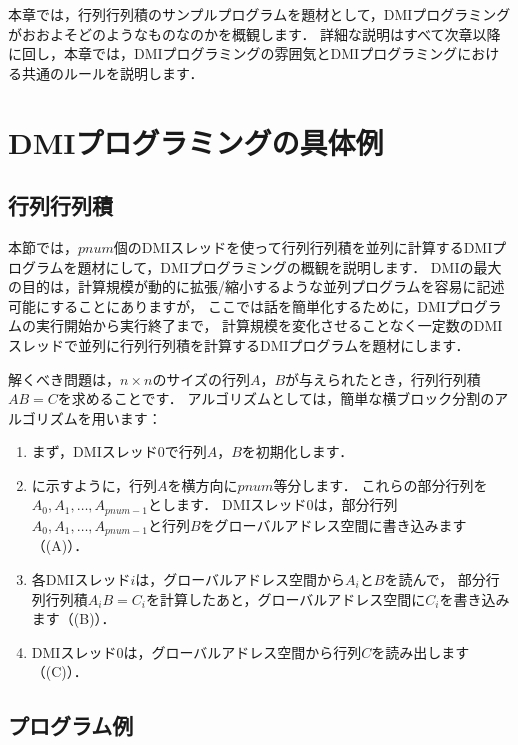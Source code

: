 \documentclass[report,12pt]{jsbook}
\begin{document}
本章では，行列行列積のサンプルプログラムを題材として，DMIプログラミングがおおよそどのようなものなのかを概観します．
詳細な説明はすべて次章以降に回し，本章では，DMIプログラミングの雰囲気とDMIプログラミングにおける共通のルールを説明します．

\section{DMIプログラミングの具体例}

\subsection{行列行列積}

本節では，$pnum$個のDMIスレッドを使って行列行列積を並列に計算するDMIプログラムを題材にして，DMIプログラミングの概観を説明します．
DMIの最大の目的は，計算規模が動的に拡張/縮小するような並列プログラムを容易に記述可能にすることにありますが，
ここでは話を簡単化するために，DMIプログラムの実行開始から実行終了まで，
計算規模を変化させることなく一定数のDMIスレッドで並列に行列行列積を計算するDMIプログラムを題材にします．

解くべき問題は，$n\times n$のサイズの行列$A$，$B$が与えられたとき，行列行列積$AB=C$を求めることです．
アルゴリズムとしては，簡単な横ブロック分割のアルゴリズムを用います：
\begin{enumerate}
\item まず，DMIスレッド0で行列$A$，$B$を初期化します．
\item {}に示すように，行列$A$を横方向に$pnum$等分します．
  これらの部分行列を$A_0,A_1,\ldots,A_{pnum-1}$とします．
  DMIスレッド0は，部分行列$A_0,A_1,\ldots,A_{pnum-1}$と行列$B$をグローバルアドレス空間に書き込みます（(A)）．
\item 各DMIスレッド$i$は，グローバルアドレス空間から$A_i$と$B$を読んで，
  部分行列行列積$A_iB=C_i$を計算したあと，グローバルアドレス空間に$C_i$を書き込みます（(B)）．
\item DMIスレッド0は，グローバルアドレス空間から行列$C$を読み出します（(C)）．
\end{enumerate}

\subsection{プログラム例}
\end{document}

